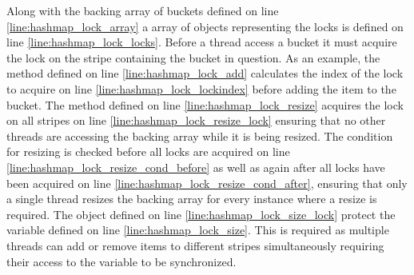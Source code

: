 Along with the backing array of buckets defined on line \ref{line:hashmap_lock_array} a array of objects representing the locks is defined on line \ref{line:hashmap_lock_locks}. Before a thread access a bucket it must acquire the lock on the stripe containing the bucket in question. As an example, the  method defined on line \ref{line:hashmap_lock_add} calculates the index of the lock to acquire on line \ref{line:hashmap_lock_lockindex} before adding the item to the bucket. The  method defined on line \ref{line:hashmap_lock_resize} acquires the lock on all stripes on line \ref{line:hashmap_lock_resize_lock} ensuring that no other threads are accessing the backing array while it is being resized. The condition for resizing is checked before all locks are acquired on line \ref{line:hashmap_lock_resize_cond_before} as well as again after all locks have been acquired on line \ref{line:hashmap_lock_resize_cond_after}, ensuring that only a single thread resizes the backing array for every instance where a resize is required. The object defined on line \ref{line:hashmap_lock_size_lock} protect the  variable defined on line \ref{line:hashmap_lock_size}. This is required as multiple threads can add or remove items to different stripes simultaneously requiring their access to the  variable to be synchronized.

